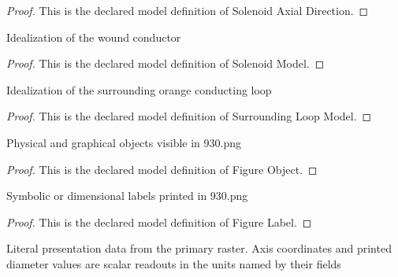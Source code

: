 \begin{proof}
  This is the declared model definition of Solenoid Axial Direction.
\end{proof}
\begin{definition}
  \label{def:physics:phyx-mini-0930:phyxminiproblems-problemphyxmini0930-solenoidmodel}
  Idealization of the wound conductor
\end{definition}
\begin{proof}
  This is the declared model definition of Solenoid Model.
\end{proof}
\begin{definition}
  \label{def:physics:phyx-mini-0930:phyxminiproblems-problemphyxmini0930-surroundingloopmodel}
  Idealization of the surrounding orange conducting loop
\end{definition}
\begin{proof}
  This is the declared model definition of Surrounding Loop Model.
\end{proof}
\begin{definition}
  \label{def:physics:phyx-mini-0930:phyxminiproblems-problemphyxmini0930-figureobject}
  Physical and graphical objects visible in 930.png
\end{definition}
\begin{proof}
  This is the declared model definition of Figure Object.
\end{proof}
\begin{definition}
  \label{def:physics:phyx-mini-0930:phyxminiproblems-problemphyxmini0930-figurelabel}
  Symbolic or dimensional labels printed in 930.png
\end{definition}
\begin{proof}
  This is the declared model definition of Figure Label.
\end{proof}
\begin{definition}
  \label{def:physics:phyx-mini-0930:phyxminiproblems-problemphyxmini0930-solenoidloopfigure}
  Literal presentation data from the primary raster. Axis coordinates and printed diameter values are scalar readouts in the units named by their fields
\end{definition}
